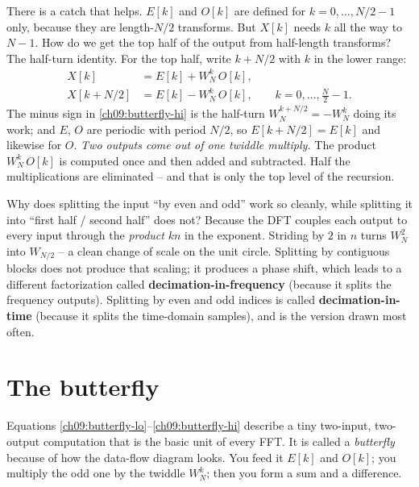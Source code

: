 There is a catch that helps. $E[k]$ and $O[k]$ are defined for $k = 0, \dots,
N/2-1$ only, because they are length-$N/2$ transforms. But $X[k]$ needs $k$ all the way
to $N-1$. How do we get the top half of the output from half-length transforms? The
half-turn identity. For the top half, write $k + N/2$ with $k$ in the lower range:
\begin{align}
X[k]        &= E[k] + W_N^{k}\,O[k], \label{ch09:butterfly-lo}\\
X[k + N/2]  &= E[k] - W_N^{k}\,O[k], \qquad k = 0, \dots, \tfrac{N}{2}-1 .
\label{ch09:butterfly-hi}
\end{align}
The minus sign in \eqref{ch09:butterfly-hi} is the half-turn $W_N^{k+N/2} = -W_N^k$
doing its work; and $E$, $O$ are periodic with period $N/2$, so $E[k+N/2]=E[k]$ and
likewise for $O$. \emph{Two outputs come out of one twiddle multiply.} The product
$W_N^k\,O[k]$ is computed once and then added and subtracted. Half the multiplications
are eliminated -- and that is only the top level of the recursion.

\begin{walkbox}
Why does splitting the input ``by even and odd'' work so cleanly, while splitting it into
``first half / second half'' does not? Because the DFT couples each output to every
input through the \emph{product} $kn$ in the exponent. Striding by $2$ in $n$ turns
$W_N^{2}$ into $W_{N/2}$ -- a clean change of scale on the unit circle. Splitting by
contiguous blocks does not produce that scaling; it produces a phase shift, which leads
to a different factorization called \textbf{decimation-in-frequency} (because it splits the frequency outputs). Splitting by even and odd indices is called \textbf{decimation-in-time} (because it splits the time-domain samples), and is the version drawn most often.
\end{walkbox}

\section{The butterfly}
\label{ch09:butterfly}

Equations \eqref{ch09:butterfly-lo}--\eqref{ch09:butterfly-hi} describe a tiny two-input,
two-output computation that is the basic unit of every FFT. It is called a \emph{butterfly}
because of how the data-flow diagram looks. You feed it $E[k]$ and $O[k]$; you multiply
the odd one by the twiddle $W_N^k$; then you form a sum and a difference.

